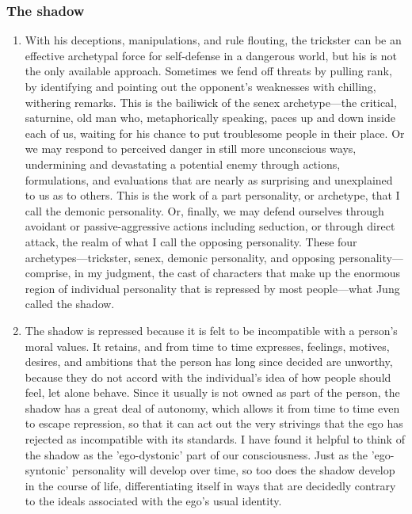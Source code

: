\begin{enumerate}
\end{enumerate}

\subsubsection{The shadow}

\begin{enumerate}

\item {} With his deceptions, manipulations,
and rule flouting, the trickster can be an effective archetypal force for
self-defense in a dangerous world, but his is not the only available approach.
Sometimes we fend off threats by pulling rank, by identifying and pointing out
the opponent's weaknesses with chilling, withering remarks. This is the
bailiwick of the senex archetype—the critical, saturnine, old man who,
metaphorically speaking, paces up and down inside each of us, waiting for his
chance to put troublesome people in their place. Or we may respond to perceived
danger in still more unconscious ways, undermining and devastating a potential
enemy through actions, formulations, and evaluations that are nearly as
surprising and unexplained to us as to others. This is the work of a part
personality, or archetype, that I call the demonic personality. Or, finally, we
may defend ourselves through avoidant or passive-aggressive actions including
seduction, or through direct attack, the realm of what I call the opposing
personality.  These four archetypes—trickster, senex, demonic personality, and
opposing personality—comprise, in my judgment, the cast of characters that make
up the enormous region of individual personality that is repressed by most
people—what Jung called the shadow.

\item {} The shadow is repressed because it is felt
to be incompatible with a person's moral values. It retains, and from time to
time expresses, feelings, motives, desires, and ambitions that the person has
long since decided are unworthy, because they do not accord with the
individual's idea of how people should feel, let alone behave. Since it usually
is not owned as part of the person, the shadow has a great deal of autonomy,
which allows it from time to time even to escape repression, so that it can act
out the very strivings that the ego has rejected as incompatible with its
standards. I have found it helpful to think of the shadow as the 'ego-dystonic'
part of our consciousness. Just as the 'ego-syntonic' personality will develop
over time, so too does the shadow develop in the course of life,
differentiating itself in ways that are decidedly contrary to the ideals
associated with the ego's usual identity.

\end{enumerate}

